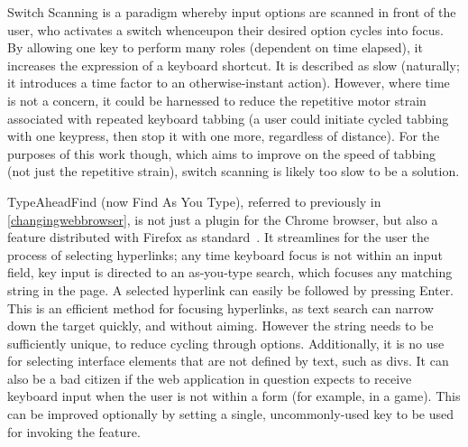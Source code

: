 \documentclass[11pt,openright,a4paper]{report}
\begin{document}
Switch Scanning is a paradigm whereby input options are scanned in front of the user, who activates a switch whenceupon their desired option cycles into focus\cite{hendrix1997adapting}. By allowing one key to perform many roles (dependent on time elapsed), it increases the expression of a keyboard shortcut. It is described as slow (naturally; it introduces a time factor to an otherwise-instant action). However, where time is not a concern, it could be harnessed to reduce the repetitive motor strain associated with repeated keyboard tabbing (a user could initiate cycled tabbing with one keypress, then stop it with one more, regardless of distance). For the purposes of this work though, which aims to improve on the speed of tabbing (not just the repetitive strain), switch scanning is likely too slow to be a solution.

TypeAheadFind (now Find As You Type), referred to previously in \cref{changingwebbrowser}, is not just a plugin for the Chrome browser, but also a feature distributed with Firefox as standard~\cite{firefoxshortcuts}. It streamlines for the user the process of selecting hyperlinks; any time keyboard focus is not within an input field, key input is directed to an as-you-type search, which focuses any matching string in the page. A selected hyperlink can easily be followed by pressing Enter. This is an efficient method for focusing hyperlinks, as text search can narrow down the target quickly, and without aiming. However the string needs to be sufficiently unique, to reduce cycling through options. Additionally, it is no use for selecting interface elements that are not defined by text, such as divs. It can also be a bad citizen if the web application in question expects to receive keyboard input when the user is not within a form (for example, in a game). This can be improved optionally by setting a single, uncommonly-used key to be used for invoking the feature.
\end{document}
